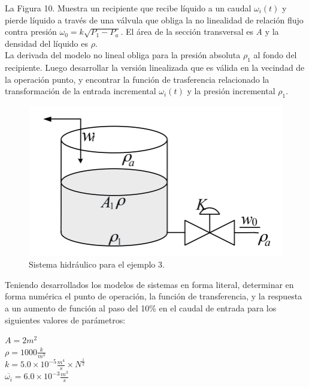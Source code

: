 \documentclass[a4paper,12pt,twoside]{proyectotanquesecci}
\begin{document}
La Figura 10. Muestra un recipiente que recibe líquido a un caudal $\omega_{i}\left(t\right)$ y pierde  líquido a través de una válvula que obliga la no linealidad de relación flujo contra presión $\omega _{0}=k\sqrt {P_{1}-P_{a}}$. El área de la sección transversal es \textit{A} y la densidad del líquido es $\rho$. \\

La derivada del modelo no lineal obliga para la presión absoluta $\rho_{1}$ al fondo del recipiente. Luego desarrollar la versión linealizada que es válida en la vecindad de la operación punto, y encontrar la función de trasferencia relacionado la transformación de la entrada incremental $\omega_{i}\left(t\right)$ y la presión incremental $\rho_{1}$.

\begin{figure}[h]
\centering
\includegraphics[scale=0.6]{Figura9}
\renewcommand{\figurename}{Fig.}
\caption{Sistema hidráulico para el ejemplo 3.}
\label{Sistema hidráulico para el ejemplo 3.}
\end{figure}

Teniendo desarrollados los modelos de sistemas en forma literal, determinar en forma numérica el punto de operación, la función de transferencia, y la respuesta a un aumento de función al paso del 10\% en el caudal de entrada para los siguientes valores de parámetros:

\begin{center}
$A=2m^{2}$ \\
$\rho=1000\frac {k}{m^{3}}$ \\
$k=5.0\times 10^{-5}\frac {m^{4}}{s}\times N^{\frac {1}{2}}$ \\
$\overline{\omega _{i}}=6.0\times 10^{-3}\frac {m^{3}}{s}$ \\
\end{center}
\end{document}
